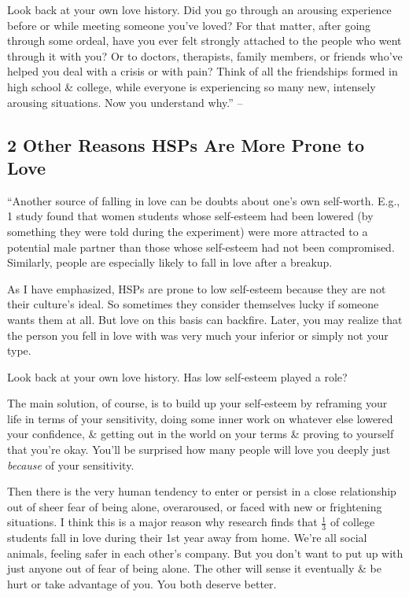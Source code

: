 \documentclass{article}
\numberwithin{equation}{section}
\begin{document}
Look back at your own love history. Did you go through an arousing experience before or while meeting someone you've loved? For that matter, after going through some ordeal, have you ever felt strongly attached to the people who went through it with you? Or to doctors, therapists, family members, or friends who've helped you deal with a crisis or with pain? Think of all the friendships formed in high school \& college, while everyone is experiencing so many new, intensely arousing situations. Now you understand why.'' -- \cite[pp. 177--178]{Aron2013}

\subsection{2 Other Reasons HSPs Are More Prone to Love}
``Another source of falling in love can be doubts about one's own self-worth. E.g., 1 study found that women students whose self-esteem had been lowered (by something they were told during the experiment) were more attracted to a potential male partner than those whose self-esteem had not been compromised. Similarly, people are especially likely to fall in love after a breakup.

As I have emphasized, HSPs are prone to low self-esteem because they are not their culture's ideal. So sometimes they consider themselves lucky if someone wants them at all. But love on this basis can backfire. Later, you may realize that the person you fell in love with was very much your inferior or simply not your type.

Look back at your own love history. Has low self-esteem played a role?

The main solution, of course, is to build up your self-esteem by reframing your life in terms of your sensitivity, doing some inner work on whatever else lowered your confidence, \& getting out in the world on your terms \& proving to yourself that you're okay. You'll be surprised how many people will love you deeply just \textit{because} of your sensitivity.

Then there is the very human tendency to enter or persist in a close relationship out of sheer fear of being alone, overaroused, or faced with new or frightening situations. I think this is a major reason why research finds that $\frac{1}{3}$ of college students fall in love during their 1st year away from home. We're all social animals, feeling safer in each other's company. But you don't want to put up with just anyone out of fear of being alone. The other will sense it eventually \& be hurt or take advantage of you. You both deserve better.
\end{document}
